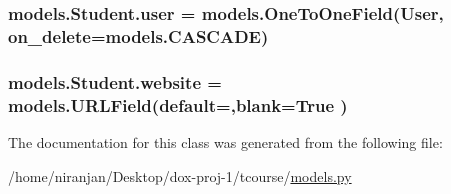 \subsubsection[{\texorpdfstring{user}{user}}]{\setlength{\rightskip}{0pt plus 5cm}models.\+Student.\+user = models.\+One\+To\+One\+Field(User, on\+\_\+delete=models.\+C\+A\+S\+C\+A\+DE)\hspace{0.3cm}{\ttfamily [static]}}\hypertarget{classmodels_1_1_student_af515b90fd2258a0d7bf779946770f2e2}{}\label{classmodels_1_1_student_af515b90fd2258a0d7bf779946770f2e2}
\subsubsection[{\texorpdfstring{website}{website}}]{\setlength{\rightskip}{0pt plus 5cm}models.\+Student.\+website = models.\+U\+R\+L\+Field(default=\textquotesingle{}\textquotesingle{},blank=True )\hspace{0.3cm}{\ttfamily [static]}}\hypertarget{classmodels_1_1_student_a9742d2ab97c25d48890034da4cbea75f}{}\label{classmodels_1_1_student_a9742d2ab97c25d48890034da4cbea75f}


The documentation for this class was generated from the following file\+:\begin{DoxyCompactItemize}
\item 
/home/niranjan/\+Desktop/dox-\/proj-\/1/tcourse/\hyperlink{models_8py}{models.\+py}\end{DoxyCompactItemize}
